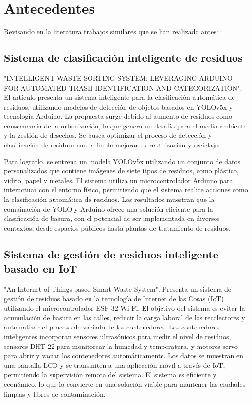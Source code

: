 \section{Antecedentes}
Revisando en la literatura trabajos similares que se han realizado antes:

\subsection{Sistema de clasificación inteligente de residuos}
"INTELLIGENT WASTE SORTING SYSTEM: LEVERAGING ARDUINO FOR AUTOMATED TRASH IDENTIFICATION AND CATEGORIZATION". El artículo presenta un sistema inteligente para la clasificación automática de residuos, utilizando modelos de detección de objetos basados en YOLOv5x y tecnología Arduino. La propuesta surge debido al aumento de residuos como consecuencia de la urbanización, lo que genera un desafío para el medio ambiente y la gestión de desechos. Se busca optimizar el proceso de detección y clasificación de residuos con el fin de mejorar su reutilización y reciclaje.

Para lograrlo, se entrena un modelo YOLOv5x utilizando un conjunto de datos personalizados que contiene imágenes de siete tipos de residuos, como plástico, vidrio, papel y metales. El sistema utiliza un microcontrolador Arduino para interactuar con el entorno físico, permitiendo que el sistema realice acciones como la clasificación automática de residuos. Los resultados muestran que la combinación de YOLO y Arduino ofrece una solución eficiente para la clasificación de basura, con el potencial de ser implementada en diversos contextos, desde espacios públicos hasta plantas de tratamiento de residuos.~\cite{mohd}

\subsection{Sistema de gestión de residuos inteligente basado en IoT}
"An Internet of Things based Smart Waste System". Presenta un sistema de gestión de residuos basado en la tecnología de Internet de las Cosas (IoT) utilizando el microcontrolador ESP-32 Wi-Fi. El objetivo del sistema es evitar la acumulación de basura en las calles, reducir la carga laboral de los recolectores y automatizar el proceso de vaciado de los contenedores. Los contenedores inteligentes incorporan sensores ultrasónicos para medir el nivel de residuos, sensores DHT-22 para monitorear la humedad y temperatura, y motores servo para abrir y vaciar los contenedores automáticamente. Los datos se muestran en una pantalla LCD y se transmiten a una aplicación móvil a través de IoT, permitiendo la supervisión remota del sistema. El sistema es eficiente y económico, lo que lo convierte en una solución viable para mantener las ciudades limpias y libres de contaminación.~\cite{jasim}

